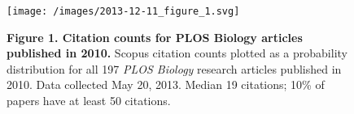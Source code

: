 \begin{Shaded}
\begin{Highlighting}[]
\StringTok{ } \NormalTok{, } \NormalTok{)}
\StringTok{ }\NormalTok{)}
\StringTok{ }\NormalTok{)}
 \NormalTok{, } \NormalTok{, } \NormalTok{, } \NormalTok{, } \NormalTok{(}\NormalTok{, }\NormalTok{), } \NormalTok{)}
  \NormalTok{)}
 \NormalTok{, }  \NormalTok{, } \NormalTok{, } \NormalTok{,}
     \NormalTok{)}
 \NormalTok{, }  \NormalTok{, } \NormalTok{, } \NormalTok{,}
     \NormalTok{, } \NormalTok{)}

\end{Highlighting}
\end{Shaded}

\begin{figure}[htbp]
\centering
\texttt{[image: /images/2013-12-11\_figure\_1.svg]}
\caption{\textbf{Figure 1. Citation counts for PLOS Biology articles
published in 2010.} Scopus citation counts plotted as a probability
distribution for all 197 \emph{PLOS Biology} research articles published
in 2010. Data collected May 20, 2013. Median 19 citations; 10\% of
papers have at least 50 citations.}
\end{figure}

